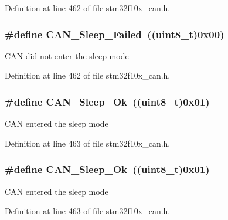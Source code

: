 Definition at line 462 of file stm32f10x\+\_\+can.\+h.

\subsubsection[{\texorpdfstring{C\+A\+N\+\_\+\+Sleep\+\_\+\+Failed}{CAN_Sleep_Failed}}]{\setlength{\rightskip}{0pt plus 5cm}\#define C\+A\+N\+\_\+\+Sleep\+\_\+\+Failed~(({\bf uint8\+\_\+t})0x00)}\hypertarget{group___c_a_n__sleep__constants_ga169500ab7169c4e9c7e9e4ea34b3e070}{}\label{group___c_a_n__sleep__constants_ga169500ab7169c4e9c7e9e4ea34b3e070}
C\+AN did not enter the sleep mode 

Definition at line 462 of file stm32f10x\+\_\+can.\+h.

\subsubsection[{\texorpdfstring{C\+A\+N\+\_\+\+Sleep\+\_\+\+Ok}{CAN_Sleep_Ok}}]{\setlength{\rightskip}{0pt plus 5cm}\#define C\+A\+N\+\_\+\+Sleep\+\_\+\+Ok~(({\bf uint8\+\_\+t})0x01)}\hypertarget{group___c_a_n__sleep__constants_gaf5c4e9d32d4faff9d0bf61e153ed7998}{}\label{group___c_a_n__sleep__constants_gaf5c4e9d32d4faff9d0bf61e153ed7998}
C\+AN entered the sleep mode 

Definition at line 463 of file stm32f10x\+\_\+can.\+h.

\subsubsection[{\texorpdfstring{C\+A\+N\+\_\+\+Sleep\+\_\+\+Ok}{CAN_Sleep_Ok}}]{\setlength{\rightskip}{0pt plus 5cm}\#define C\+A\+N\+\_\+\+Sleep\+\_\+\+Ok~(({\bf uint8\+\_\+t})0x01)}\hypertarget{group___c_a_n__sleep__constants_gaf5c4e9d32d4faff9d0bf61e153ed7998}{}\label{group___c_a_n__sleep__constants_gaf5c4e9d32d4faff9d0bf61e153ed7998}
C\+AN entered the sleep mode 

Definition at line 463 of file stm32f10x\+\_\+can.\+h.

